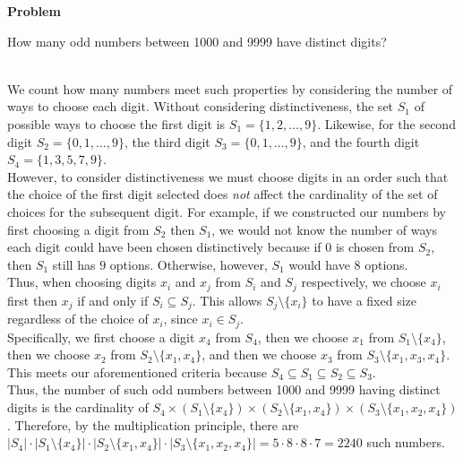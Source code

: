 \documentclass[12pt]{article}
\newcounter{problem}[section]
\newenvironment{problem}[1][]
{\refstepcounter{problem}\noindent\textbf{Problem~\theproblem #1}\vspace{0.2cm}\\\begin{lrbox}{\mybox}\begin{minipage}{\textwidth}}
{\end{minipage}\end{lrbox}\fbox{\usebox{\mybox}}}
\newenvironment{solution}{\vspace{0.1cm}\\}{\vspace{0.5cm}}
\begin{document}
\begin{problem}
    How many odd numbers between 1000 and 9999 have distinct digits?
\end{problem}
\begin{solution}
    We count how many numbers meet such properties by considering the number of ways to choose each digit. Without considering distinctiveness, the set $S_1$ of possible ways to choose the first digit is $S_1=\{1,2,\dots,9\}$. Likewise, for the second digit $S_2=\{0,1,\dots,9\}$, the third digit $S_3=\{0,1,\dots,9\}$, and the fourth digit $S_{4}= \{1,3,5,7,9\}$.\\
    
    However, to consider distinctiveness we must choose digits in an order such that the choice of the first digit selected does \textit{not} affect the cardinality of the set of choices for the subsequent digit. For example, if we constructed our numbers by first choosing a digit from $S_2$ then $S_1$, we would not know the number of ways each digit could have been chosen distinctively because if $0$ is chosen from $S_2$, then $S_1$ still has $9$ options. Otherwise, however, $S_1$ would have $8$ options.\\
    
    Thus, when choosing digits $x_i$ and $x_j$ from $S_i$ and $S_j$ respectively, we choose $x_i$ first then $x_j$ if and only if $S_i\subseteq S_j$. This allows $S_j\setminus \{x_i\}$ to have a fixed size regardless of the choice of $x_i$, since $x_i \in S_j$.\\
    
    Specifically, we first choose a digit $x_4$ from $S_4$, then we choose $x_1$ from $S_1\setminus \{x_4\}$, then we choose $x_2$ from $S_2\setminus \{x_1,x_4\}$, and then we choose $x_3$ from $S_3\setminus \{x_1,x_3,x_4\}$. This meets our aforementioned criteria because $S_4\subseteq S_1 \subseteq S_2 \subseteq S_3$.\\
    
    Thus, the number of such odd numbers between 1000 and 9999 having distinct digits is the cardinality of $S_4 \times (S_1\setminus \{x_4\}) \times (S_2 \setminus \{x_1,x_4\}) \times (S_3 \setminus \{x_1,x_2,x_4\})$. Therefore, by the multiplication principle, there are $|S_4| \cdot |S_1\setminus \{x_4\}| \cdot |S_2 \setminus \{x_1,x_4\}| \cdot |S_3 \setminus \{x_1,x_2,x_4\}|=5\cdot 8 \cdot 8 \cdot 7=2240$ such numbers.
\end{solution}
\end{document}
